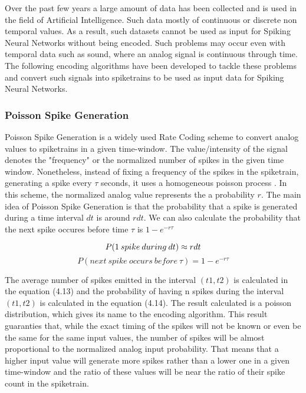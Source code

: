 \documentclass[12pt]{report}
\begin{document}
Over the past few years a large amount of data has been collected and is used in the field of Artificial Intelligence. Such data mostly of continuous or discrete non temporal values. As a result, such datasets cannot be used as input for Spiking Neural Networks without being encoded. Such problems may occur even with temporal data such as sound, where an analog signal is continuous through time. The following encoding algorithms have been developed to tackle these problems and convert such signals into spiketrains to be used as input data for Spiking Neural Networks.

\subsubsection{Poisson Spike Generation}

Poisson Spike Generation is a widely used Rate Coding scheme to convert analog values to spiketrains in a given time-window. The value/intensity of the signal denotes the "frequency" or the normalized number of spikes in the given time window. Nonetheless, instead of fixing a frequency of the spikes in the spiketrain, generating a spike every \(\tau\) seconds, it uses a homogeneous poisson process \cite{Heeger2000}. In this scheme, the normalized analog value represents the a probability \(r\). The main idea of Poisson Spike Generation is that the probability that a spike is generated during a time interval \(dt\) is around \(rdt\). We can also calculate the probability that the next spike occures before time \(\tau\) is \(1-e^{-r\tau}\)

\begin{equation}
    P(1\:spike\:during\:dt) \approx rdt \\
\end{equation}
\begin{equation}
    P(next\:spike\:occurs\:before\:\tau) = 1-e^{-r\tau}
\end{equation}

\medskip

The average number of spikes emitted in the interval \((t1,t2)\) is calculated in the equation (4.13) and the probability of having n spikes during the interval \((t1,t2)\) is calculated in the equation (4.14). The result calculated is a poisson distribution, which gives its name to the encoding algorithm. This result guaranties that, while the exact timing of the spikes will not be known or even be the same for the same input values, the number of spikes will be almost proportional to the normalized analog input probability. That means that a higher input value will generate more spikes rather than a lower one in a given time-window and the ratio of these values will be near the ratio of their spike count in the spiketrain. 
\end{document}
